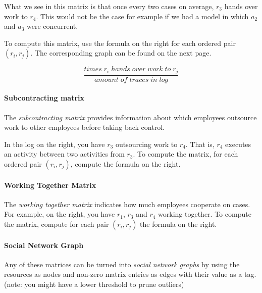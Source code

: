 \documentclass[english]{panikzettel}
\begin{document}
What we see in this matrix is that once every two cases on average, $r_3$ hands over work to $r_4$. This would not be the case for example if we had a model in which $a_2$ and $a_3$ were concurrent.

\begin{halfboxl}
To compute this matrix, use the formula on the right for each ordered pair $(r_i,r_j)$. The corresponding graph can be found on the next page.
\end{halfboxl}%
\begin{halfboxr}
\vspace{-5pt}
\[\frac{times \; r_i \; hands \; over \; work \; to \; r_j}{amount \; of \; traces \; in \; log}\]
\end{halfboxr}

\begin{halfboxl}
\paragraph{Subcontracting matrix} The \textit{subcontracting matrix} provides information about which employees outsource work to other employees before taking back control.

In the log on the right, you have $r_3$ outsourcing work to $r_4$. That is, $r_4$ executes an activity between two activities from $r_3$. To compute the matrix, for each ordered pair $(r_i,r_j)$, compute the formula on the right.
\paragraph{Working Together Matrix} The \textit{working together matrix} indicates how much employees cooperate on cases.
For example, on the right, you have $r_1$, $r_3$ and $r_4$ working together. To compute the matrix, compute for each pair $(r_i,r_j)$ the formula on the right.
\paragraph{Social Network Graph} Any of these matrices can be turned into \textit{social network graphs} by using the resources as nodes and non-zero matrix entries as edges with their value as a tag. (note: you might have a lower threshold to prune outliers)
\end{halfboxl}%
\end{document}
